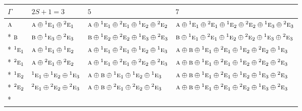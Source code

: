 \documentclass[10pt,a4paper]{article}
\numberwithin{equation}{section}
\newcommand{\irr}[1]{\text{\normalfont\scshape #1}}
\newcommand{\conjpair}[1]{{}^{#1}}
\begin{document}
{\small\setlength{\tabcolsep}{3pt}\begin{longtable}{@{}llll@{}}\toprule
$\Gamma$ & $2S + 1 = 3$ & $5$ & $7$\\\midrule\endhead
\bottomrule\endfoot\endlastfoot
$\irr{a}$ & $\irr{a}\oplus \conjpair{1}\irr{e}_{1}\oplus \conjpair{2}\irr{e}_{1}$ & $\irr{a}\oplus \conjpair{1}\irr{e}_{1}\oplus \conjpair{2}\irr{e}_{1}\oplus \conjpair{1}\irr{e}_{2}\oplus \conjpair{2}\irr{e}_{2}$ & $\irr{a}\oplus \conjpair{1}\irr{e}_{1}\oplus \conjpair{2}\irr{e}_{1}\oplus \conjpair{1}\irr{e}_{2}\oplus \conjpair{2}\irr{e}_{2}\oplus \conjpair{1}\irr{e}_{3}\oplus \conjpair{2}\irr{e}_{3}$\\*
$\irr{b}$ & $\irr{b}\oplus \conjpair{1}\irr{e}_{3}\oplus \conjpair{2}\irr{e}_{3}$ & $\irr{b}\oplus \conjpair{1}\irr{e}_{2}\oplus \conjpair{2}\irr{e}_{2}\oplus \conjpair{1}\irr{e}_{3}\oplus \conjpair{2}\irr{e}_{3}$ & $\irr{b}\oplus \conjpair{1}\irr{e}_{1}\oplus \conjpair{2}\irr{e}_{1}\oplus \conjpair{1}\irr{e}_{2}\oplus \conjpair{2}\irr{e}_{2}\oplus \conjpair{1}\irr{e}_{3}\oplus \conjpair{2}\irr{e}_{3}$\\*
$\conjpair{1}\irr{e}_{1}$ & $\irr{a}\oplus \conjpair{1}\irr{e}_{1}\oplus \conjpair{1}\irr{e}_{2}$ & $\irr{a}\oplus \conjpair{1}\irr{e}_{1}\oplus \conjpair{2}\irr{e}_{1}\oplus \conjpair{1}\irr{e}_{2}\oplus \conjpair{1}\irr{e}_{3}$ & $\irr{a}\oplus \irr{b}\oplus \conjpair{1}\irr{e}_{1}\oplus \conjpair{2}\irr{e}_{1}\oplus \conjpair{1}\irr{e}_{2}\oplus \conjpair{2}\irr{e}_{2}\oplus \conjpair{1}\irr{e}_{3}$\\*
$\conjpair{2}\irr{e}_{1}$ & $\irr{a}\oplus \conjpair{2}\irr{e}_{1}\oplus \conjpair{2}\irr{e}_{2}$ & $\irr{a}\oplus \conjpair{1}\irr{e}_{1}\oplus \conjpair{2}\irr{e}_{1}\oplus \conjpair{2}\irr{e}_{2}\oplus \conjpair{2}\irr{e}_{3}$ & $\irr{a}\oplus \irr{b}\oplus \conjpair{1}\irr{e}_{1}\oplus \conjpair{2}\irr{e}_{1}\oplus \conjpair{1}\irr{e}_{2}\oplus \conjpair{2}\irr{e}_{2}\oplus \conjpair{2}\irr{e}_{3}$\\*
$\conjpair{1}\irr{e}_{2}$ & $\conjpair{1}\irr{e}_{1}\oplus \conjpair{1}\irr{e}_{2}\oplus \conjpair{1}\irr{e}_{3}$ & $\irr{a}\oplus \irr{b}\oplus \conjpair{1}\irr{e}_{1}\oplus \conjpair{1}\irr{e}_{2}\oplus \conjpair{1}\irr{e}_{3}$ & $\irr{a}\oplus \irr{b}\oplus \conjpair{1}\irr{e}_{1}\oplus \conjpair{2}\irr{e}_{1}\oplus \conjpair{1}\irr{e}_{2}\oplus \conjpair{1}\irr{e}_{3}\oplus \conjpair{2}\irr{e}_{3}$\\*
$\conjpair{2}\irr{e}_{2}$ & $\conjpair{2}\irr{e}_{1}\oplus \conjpair{2}\irr{e}_{2}\oplus \conjpair{2}\irr{e}_{3}$ & $\irr{a}\oplus \irr{b}\oplus \conjpair{2}\irr{e}_{1}\oplus \conjpair{2}\irr{e}_{2}\oplus \conjpair{2}\irr{e}_{3}$ & $\irr{a}\oplus \irr{b}\oplus \conjpair{1}\irr{e}_{1}\oplus \conjpair{2}\irr{e}_{1}\oplus \conjpair{2}\irr{e}_{2}\oplus \conjpair{1}\irr{e}_{3}\oplus \conjpair{2}\irr{e}_{3}$\\*

\end{longtable}}
\end{document}
